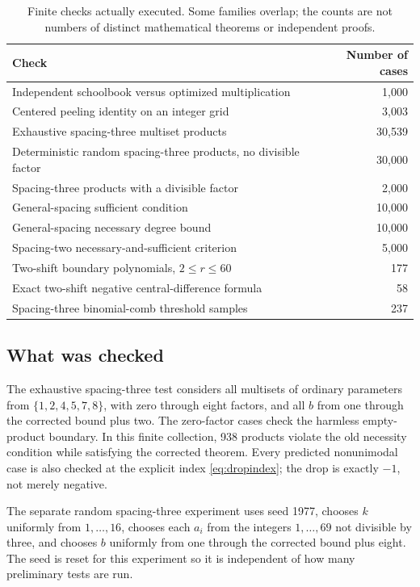 \documentclass[11pt]{article}
\theoremstyle{research}
\theoremstyle{definition}
\numberwithin{equation}{section}
\begin{document}
\begin{table}[htbp]
\centering
\small
\begin{tabular}{@{}p{.69\linewidth}r@{}}
\toprule
Check & Number of cases \\
\midrule
Independent schoolbook versus optimized multiplication & 1,000 \\
Centered peeling identity on an integer grid & 3,003 \\
Exhaustive spacing-three multiset products & 30,539 \\
Deterministic random spacing-three products, no divisible factor & 30,000 \\
Spacing-three products with a divisible factor & 2,000 \\
General-spacing sufficient condition & 10,000 \\
General-spacing necessary degree bound & 10,000 \\
Spacing-two necessary-and-sufficient criterion & 5,000 \\
Two-shift boundary polynomials, $2\le r\le60$ & 177 \\
Exact two-shift negative central-difference formula & 58 \\
Spacing-three binomial-comb threshold samples & 237 \\
\bottomrule
\end{tabular}
\caption{Finite checks actually executed. Some families overlap; the counts are not
numbers of distinct mathematical theorems or independent proofs.}
\label{tab:tests}
\end{table}

\subsection{What was checked}
The exhaustive spacing-three test considers all multisets of ordinary
parameters from $\{1,2,4,5,7,8\}$, with zero through eight factors,
and all $b$ from one through the corrected bound plus two.
The zero-factor cases check the harmless empty-product boundary.
In this finite collection, 938 products violate the old necessity
condition while satisfying the corrected theorem.
Every predicted nonunimodal case is also checked at the explicit index
\eqref{eq:dropindex}; the drop is exactly $-1$, not merely negative.

The separate random spacing-three experiment uses seed 1977, chooses
$k$ uniformly from $1,\ldots,16$, chooses each $a_i$ from the integers
$1,\ldots,69$ not divisible by three, and chooses $b$ uniformly from
one through the corrected bound plus eight. The seed is reset for this
experiment so it is independent of how many preliminary tests are run.
\end{document}
